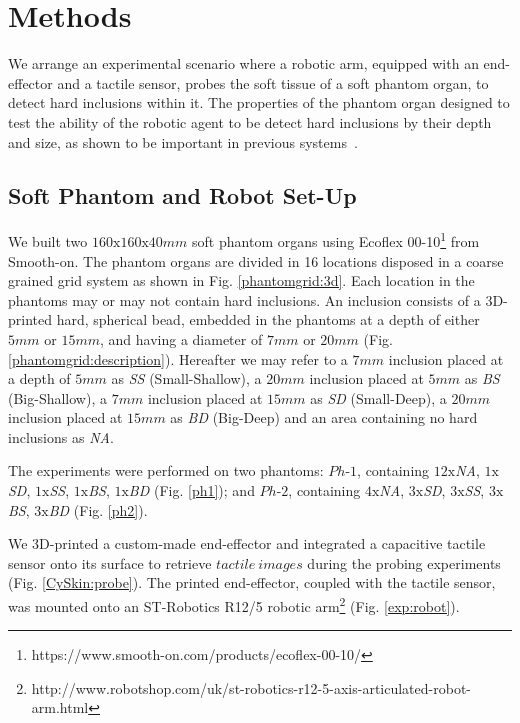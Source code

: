 \section{Methods} \label{sec_methods}
We arrange an experimental scenario where a robotic arm, equipped with an end-effector and a tactile sensor, probes the soft tissue of a soft phantom organ, to detect hard inclusions within it. The properties of the phantom organ designed to test the ability of the robotic agent to be detect hard inclusions by their depth and size, as shown to be important in previous systems~\cite{herzig2018variable}.


\subsection{Soft Phantom and Robot Set-Up} \label{sec_experimental_setups}
We built two $160\text{x}160\text{x}40mm$ soft phantom organs using Ecoflex 00-10\footnote[2]
{https://www.smooth-on.com/products/ecoflex-00-10/} from Smooth-on. The phantom organs are divided in 16 
locations disposed in a coarse grained grid system as shown in Fig. \ref{phantomgrid:3d}. Each location in the 
phantoms may or may not contain hard inclusions. An inclusion consists of a 3D-printed hard, spherical bead, 
embedded in the phantoms at a depth of either $5mm$ or $15mm$, and having a diameter of 
$7mm$ or $20mm$ (Fig. \ref{phantomgrid:description}). Hereafter we may refer to a $7mm$ inclusion 
placed at a depth of $5mm$ as \textit{SS} (Small-Shallow), a $20mm$ inclusion placed at $5mm$ as \textit{BS} 
(Big-Shallow), a $7mm$ inclusion placed at $15mm$ as \textit{SD} (Small-Deep), a $20mm$ inclusion placed at 
$15mm$ as \textit{BD} (Big-Deep) and an area containing no hard inclusions as \textit{NA}.

The experiments were performed on two phantoms: $Ph\text{-}1$, containing $12\text{x}$\textit{NA}, $1\text{x}$\textit{SD}, $1\text{x}$\textit{SS}, $1\text{x}$\textit{BS}, $1\text{x}$\textit{BD} (Fig. \ref{ph1}); and $Ph\text{-}2$, containing $4\text{x}$\textit{NA}, $3\text{x}$\textit{SD}, $3\text{x}$\textit{SS}, $3\text{x}$\textit{BS}, $3\text{x}$\textit{BD} (Fig. \ref{ph2}).

We 3D-printed a custom-made end-effector and integrated a capacitive tactile sensor onto its 
surface to retrieve $tactile\ images$ during the probing experiments (Fig. \ref{CySkin:probe}). 
The printed end-effector, coupled with the tactile sensor, was mounted onto an ST-Robotics R12/5 robotic 
arm\footnote[3]{http://www.robotshop.com/uk/st-robotics-r12-5-axis-articulated-robot-arm.html}   
(Fig. \ref{exp:robot}). 

